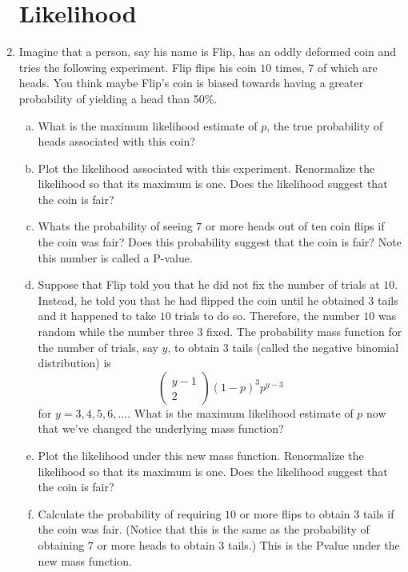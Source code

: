 \documentclass[12pt]{article}
\begin{document}
\begin{enumerate}[1.]
\begin{enumerate}[1.]
\end{enumerate}

\section{Likelihood}
\item Imagine that a person, say his name is Flip, has an oddly
  deformed coin and tries the following experiment.  Flip flips his
  coin $10$ times, $7$ of which are heads. You think maybe Flip's coin
  is biased towards having a greater probability of yielding a head than 50\%.
  \begin{enumerate}[a.]
  \item What is the maximum likelihood estimate of $p$, the true probability of
    heads associated with this coin? 
  \item Plot the likelihood associated with this experiment. Renormalize the
    likelihood so that its maximum is one. Does the likelihood suggest that
    the coin is fair?
  \item Whats the probability of seeing $7$ or more heads out of ten
    coin flips if the coin was fair? Does this probability suggest
    that the coin is fair? Note this number is called a P-value.
  \item Suppose that Flip told you that he did not fix the number of
    trials at $10$. Instead, he told you that he had flipped the coin
    until he obtained $3$ tails and it happened to take $10$ trials to
    do so. Therefore, the number $10$ was random while the number
    three $3$ fixed.  The probability mass function for the number of
    trials, say $y$, to obtain $3$ tails (called the negative binomial
    distribution) is
    $$
    \left(\begin{array}{c}y-1 \\ 2\end{array}\right)(1-p)^3p^{y - 3}
    $$
    for $y=3,4,5,6,\ldots$. What is the maximum likelihood estimate of
    $p$ now that we've changed the underlying mass function?
  \item Plot the likelihood under this new mass function. Renormalize
    the likelihood so that its maximum is one. Does the likelihood
    suggest that the coin is fair?
  \item Calculate the probability of requiring $10$ or more flips to
    obtain $3$ tails if the coin was fair. (Notice that this is the
    same as the probability of obtaining $7$ or more heads to obtain
    $3$ tails.) This is the Pvalue under
    the new mass function.

\end{enumerate}
\end{enumerate}
\end{document}
